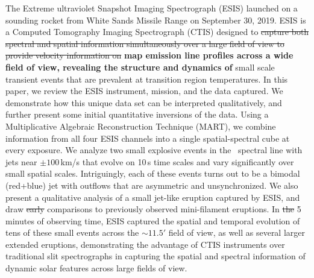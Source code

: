 The Extreme ultraviolet Snapshot Imaging Spectrograph (ESIS) launched on a sounding rocket from White Sands Missile Range on September 30, 2019.
ESIS is a Computed Tomography Imaging Spectrograph (CTIS) designed to \sout{capture both spectral and spatial information simultaneously over a large field of view to provide velocity information on} \textbf{map emission line profiles across a wide field of view, revealing the structure and dynamics of}  small scale transient events that are prevalent at transition region temperatures.
In this paper, we review the ESIS instrument, mission, and the data captured.
We demonstrate how this unique data set can be interpreted qualitatively, and further present some initial quantitative inversions of the data.
Using a Multiplicative Algebraic Reconstruction Technique (MART), we combine information from all four ESIS channels into a single spatial-spectral cube at every exposure.
We analyze two small explosive events in the \ov \ spectral line with jets near $\pm 100$\,km/s that evolve on 10\,s time scales and vary significantly over small spatial scales. Intriguingly, each of these events turns out to be a bimodal (red+blue) jet with outflows that are asymmetric and unsynchronized.
We also present a qualitative analysis of a small jet-like eruption captured by ESIS, and draw \sout{early} comparisons to previously observed mini-filament eruptions.
In \sout{the} 5 minutes of observing time, ESIS captured the spatial and temporal evolution of tens of these small events across the $\sim 11.5'$ field of view, as well as several larger extended eruptions, demonstrating the advantage of CTIS instruments over traditional slit spectrographs in capturing the spatial and spectral information of dynamic solar features across large fields of view.